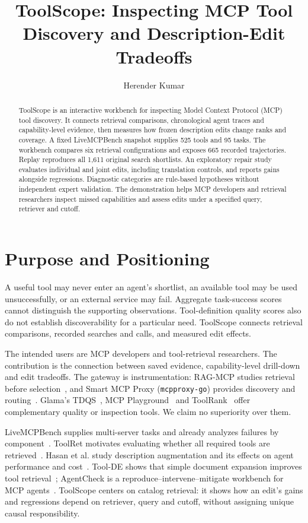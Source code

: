 \documentclass[runningheads,a4paper]{llncs}
\title{ToolScope: Inspecting MCP Tool Discovery and Description-Edit Tradeoffs}
\author{Herender Kumar}
\institute{Independent Researcher\\
\email{herender121112@gmail.com}}
\begin{document}
\maketitle
\begin{abstract}
ToolScope is an interactive workbench for inspecting Model Context Protocol (MCP) tool discovery. It connects retrieval comparisons, chronological agent traces and capability-level evidence, then measures how frozen description edits change ranks and coverage. A fixed LiveMCPBench snapshot supplies 525 tools and 95 tasks. The workbench compares six retrieval configurations and exposes 665 recorded trajectories. Replay reproduces all 1,611 original search shortlists. An exploratory repair study evaluates individual and joint edits, including translation controls, and reports gains alongside regressions. Diagnostic categories are rule-based hypotheses without independent expert validation. The demonstration helps MCP developers and retrieval researchers inspect missed capabilities and assess edits under a specified query, retriever and cutoff.
\end{abstract}

\section{Purpose and Positioning}
A useful tool may never enter an agent's shortlist, an available tool may be used unsuccessfully, or an external service may fail. Aggregate task-success scores cannot distinguish the supporting observations. Tool-definition quality scores also do not establish discoverability for a particular need. ToolScope connects retrieval comparisons, recorded searches and calls, and measured edit effects.

The intended users are MCP developers and tool-retrieval researchers. The contribution is the connection between saved evidence, capability-level drill-down and edit tradeoffs. The gateway is instrumentation: RAG-MCP studies retrieval before selection~\cite{ragmcp}, and Smart MCP Proxy (\texttt{mcpproxy-go}) provides discovery and routing~\cite{proxy}. Glama's TDQS~\cite{tdqs}, MCP Playground~\cite{playground} and ToolRank~\cite{toolrank} offer complementary quality or inspection tools. We claim no superiority over them.

LiveMCPBench supplies multi-server tasks and already analyzes failures by component~\cite{live}. ToolRet motivates evaluating whether all required tools are retrieved~\cite{toolret}. Hasan et al. study description augmentation and its effects on agent performance and cost~\cite{smelly}. Tool-DE shows that simple document expansion improves tool retrieval~\cite{toolde}; AgentCheck is a reproduce--intervene--mitigate workbench for MCP agents~\cite{agentcheck}. ToolScope centers on catalog retrieval: it shows how an edit's gains and regressions depend on retriever, query and cutoff, without assigning unique causal responsibility.
\end{document}
